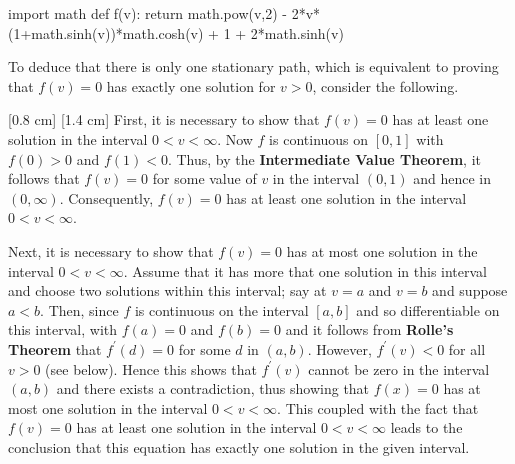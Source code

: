 \begin{pycode}
import math
def f(v):
	return math.pow(v,2) - 2*v*(1+math.sinh(v))*math.cosh(v) + 1 + 2*math.sinh(v)
\end{pycode}
To deduce that there is only one stationary path, which is equivalent to proving that $f(v)=0$ has exactly one solution for $v>0$, consider the following.

[0.8 cm]
[1.4 cm]
First, it is necessary to show that $f(v)=0$ has at least one solution in the interval $0<v<\infty$. Now $f$ is continuous on $[0,1]$ with $f(0)> 0$ and $f(1) < 0$. Thus, by the \textbf{Intermediate Value Theorem}, it follows that $f(v)=0$ for some value of $v$ in the interval $(0,1)$ and hence in $(0,\infty)$. Consequently, $f(v)=0$ has at least one solution in the interval $0<v<\infty$.

Next, it is necessary to show that $f(v)=0$ has at most one solution in the interval $0<v<\infty$. Assume that it has more that one solution in this interval and choose two solutions within this interval; say at $v=a$ and $v=b$ and suppose $a < b$.  Then, since $f$ is continuous on the interval $[a,b]$ and so differentiable on this interval, with $f(a)=0$ and $f(b)=0$ and it follows from \textbf{Rolle's Theorem} that $f^\prime(d)=0$ for some $d$ in $(a,b)$. However, $f^\prime(v) < 0$ for all $v>0$ (see below). Hence this shows that $f^\prime(v)$ cannot be zero in the interval $(a,b)$ and there exists a contradiction, thus showing that $f(x) = 0$ has at most one solution in the interval $0<v<\infty$. This coupled with the fact that $f(v) = 0$ has at least one solution in the interval $0 < v < \infty$ leads to the conclusion that this equation has exactly one solution in the given interval.


